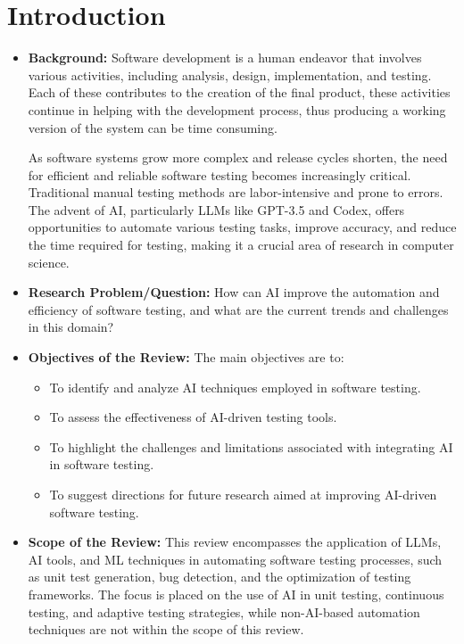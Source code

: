 \documentclass[12pt,a4paper]{article}
\begin{document}
\section{Introduction}
\begin{itemize}
    \item \textbf{Background:} Software development is a human endeavor that involves various activities, including analysis, design, implementation, and testing. Each of these contributes to the creation of the final product, these activities continue in helping with the development process, thus producing a working version of the system can be time consuming.

    As software systems grow more complex and release cycles shorten, the need for efficient and reliable software testing becomes increasingly critical. Traditional manual testing methods are labor-intensive and prone to errors. The advent of AI, particularly LLMs like GPT-3.5 and Codex, offers opportunities to automate various testing tasks, improve accuracy, and reduce the time required for testing, making it a crucial area of research in computer science.

    \item \textbf{Research Problem/Question:}
    How can AI improve the automation and efficiency of software testing, and what are the current trends and challenges in this domain?

    \item \textbf{Objectives of the Review:} The main objectives are to:
    \begin{itemize}
    \item To identify and analyze AI techniques employed in software testing.
    
    \item To assess the effectiveness of AI-driven testing tools.
    
    \item To highlight the challenges and limitations associated with integrating AI in software testing.
    
    \item To suggest directions for future research aimed at improving AI-driven software testing.
    \end{itemize}
    
    \item \textbf{Scope of the Review:} This review encompasses the application of LLMs, AI tools, and ML techniques in automating software testing processes, such as unit test generation, bug detection, and the optimization of testing frameworks. The focus is placed on the use of AI in unit testing, continuous testing, and adaptive testing strategies, while non-AI-based automation techniques are not within the scope of this review.

\end{itemize}
\end{document}
